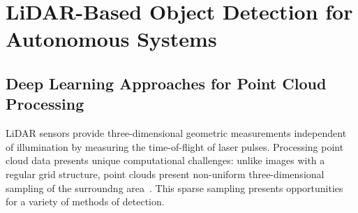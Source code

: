 \documentclass{erauthesis}
\begin{document}




\section{LiDAR-Based Object Detection for Autonomous Systems}

\subsection{Deep Learning Approaches for Point Cloud Processing}

\acl{LiDAR} sensors provide three-dimensional geometric measurements independent of illumination by measuring the time-of-flight of laser pulses.
Processing point cloud data presents unique computational challenges: unlike images with a regular grid structure, point clouds present non-uniform three-dimensional sampling of the surroundng area~\cite {zhou2018, shi2019}.
This sparse sampling presents opportunities for a variety of methods of detection.
\end{document}
